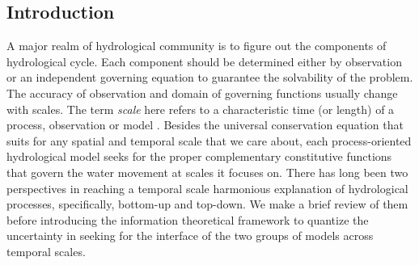 \documentclass[11pt]{article}
\begin{document}
\begin{abstract}




\end{abstract}
 


\newpage
\begin{center}
\tableofcontents
\end{center}

\newpage

\begin{center}
\section{Introduction}
\end{center}

A major realm of hydrological community is to figure out the components of hydrological cycle. Each component should be determined either by observation or an independent governing equation to guarantee the solvability of the problem. The accuracy of observation  and domain of governing functions usually change with scales. The term \emph{scale} here refers to a characteristic time (or length) of a process, observation or model \cite{bloschl1995scale}.  Besides the  universal conservation equation that suits for any spatial and temporal scale that we care about, each process-oriented hydrological model seeks for the proper complementary constitutive functions that govern the water movement at scales it focuses on. There has long been two perspectives in reaching a temporal scale harmonious explanation of hydrological processes, specifically, bottom-up and top-down. We make a brief review of them before introducing the information theoretical framework to quantize the uncertainty in seeking for the interface of the two groups of models across temporal scales. 
\end{document}
